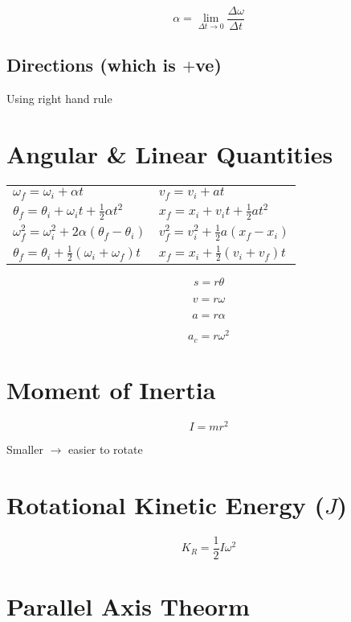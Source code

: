 \documentclass[12pt]{article}
\begin{document}
\begin{spacing}{1.5}
$$\alpha = \lim_{\Delta t \to 0} \frac{\Delta \omega}{\Delta t}$$

\subsection{Directions (which is $+$ve)}

Using right hand rule


\section{Angular \& Linear Quantities}

\begin{tabular}{p{5cm} | l}
	
	$\omega_f = \omega_i + \alpha t$ &
	$v_f = v_i + at$ \\
	
	$\theta_f = \theta_i + \omega_i t + \frac{1}{2} \alpha t^2$ & 
	$x_f = x_i + v_i t + \frac{1}{2} at^2$ \\
	
	$\omega_f^2 = \omega_i^2 + 2\alpha(\theta_f - \theta_i)$ &
	$v_f^2 = v_i^2 + \frac{1}{2} a (x_f - x_i)$ \\
	
	$\theta_f = \theta_i + \frac{1}{2} (\omega_i + \omega_f) t$ & 
	$x_f = x_i + \frac{1}{2} (v_i + v_f) t$
	
\end{tabular}

$$s = r \theta$$

$$v = r \omega$$

$$a = r \alpha$$

$$a_c = r \omega^2$$

\section{Moment of Inertia}

$$I = mr^2$$

Smaller $\rightarrow$ easier to rotate

\section{Rotational Kinetic Energy ($J$)}

$$K_R = \frac{1}{2} I \omega^2$$

\section{Parallel Axis Theorm}


\end{spacing}
\end{document}
